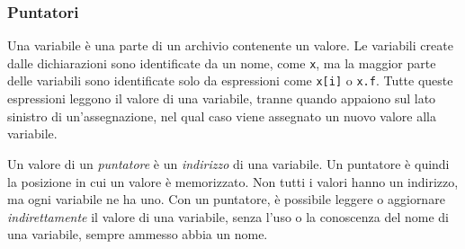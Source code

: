 \documentclass[../../../thesis.tex]{subfiles}
\begin{document}
    \subsubsection{Puntatori}
    Una variabile è una parte di un archivio contenente un valore.
    Le variabili create dalle dichiarazioni sono identificate da un nome, come \verb"x", ma la maggior parte delle variabili sono identificate solo da espressioni come \verb"x[i]" o \verb"x.f".
    Tutte queste espressioni leggono il valore di una variabile, tranne quando appaiono sul lato sinistro di un'assegnazione, nel qual caso viene assegnato un nuovo valore alla variabile.
    \hfill \vspace{12pt}

    Un valore di un \textit{puntatore} è un \textit{indirizzo} di una variabile.
    Un puntatore è quindi la posizione in cui un valore è memorizzato.
    Non tutti i valori hanno un indirizzo, ma ogni variabile ne ha uno.
    Con un puntatore, è possibile leggere o aggiornare \textit{indirettamente} il valore di una variabile, senza l'uso o la conoscenza del nome di una variabile, sempre ammesso abbia un nome.
    \hfill \vspace{12pt}
\end{document}
